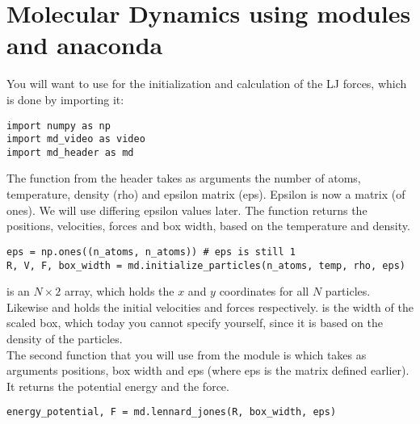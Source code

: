 \documentclass{article}
\begin{document}
\newpage


\section{Molecular Dynamics using modules and anaconda}

You will want to use  for the initialization and calculation of the LJ forces, which is done by importing it:

\begin{lstlisting}
import numpy as np
import md_video as video
import md_header as md
\end{lstlisting}

The  function from the header takes as arguments
the number of atoms, temperature, density (rho) and epsilon matrix (eps).
Epsilon is now a matrix (of ones). We will use differing epsilon values later.
The function returns the positions, velocities, forces and box width, based on the temperature and density.

\begin{lstlisting}
eps = np.ones((n_atoms, n_atoms)) # eps is still 1
R, V, F, box_width = md.initialize_particles(n_atoms, temp, rho, eps)
\end{lstlisting}

 is an $N\times2$ array, which holds the $x$ and $y$ coordinates for all $N$ particles.
Likewise  and  holds the initial velocities and forces respectively.
 is the width of the scaled box, which today you cannot specify yourself,
since it is based on the density of the particles.\\

The second function that you will use from the  module is  which takes as arguments positions, box width and eps (where eps is the matrix defined earlier).
It returns the potential energy and the force.

\begin{lstlisting}
energy_potential, F = md.lennard_jones(R, box_width, eps)
\end{lstlisting}
\end{document}
